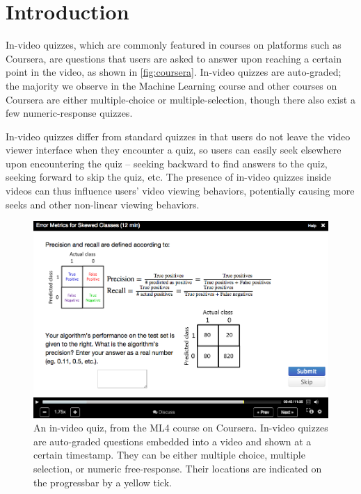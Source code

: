 \documentclass{sigchi}
\begin{document}


\section{Introduction}

In-video quizzes, which are commonly featured in courses on platforms such as Coursera, are questions that users are asked to answer upon reaching a certain point in the video, as shown in \autoref{fig:coursera}. In-video quizzes are auto-graded; the majority we observe in the Machine Learning course and other courses on Coursera are either multiple-choice or multiple-selection, though there also exist a few numeric-response quizzes.

In-video quizzes differ from standard quizzes in that users do not leave the video viewer interface when they encounter a quiz, so users can easily seek elsewhere upon encountering the quiz -- seeking backward to find answers to the quiz, seeking forward to skip the quiz, etc.
The presence of in-video quizzes inside videos can thus influence users' video viewing behaviors, potentially causing more seeks and other non-linear viewing behaviors.

\begin{figure}
\includegraphics[width=1.0\columnwidth]{coursera}
\caption{An in-video quiz, from the ML4 course on Coursera. In-video quizzes are auto-graded questions embedded into a video and shown at a certain timestamp. They can be either multiple choice, multiple selection, or numeric free-response. Their locations are indicated on the progressbar by a yellow tick.}
\label{fig:coursera}
\end{figure}
\end{document}
